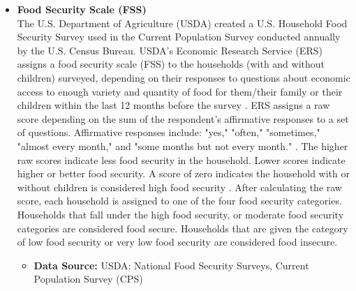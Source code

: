 \documentclass[12pt,letterpaper]{report}
\begin{document}
\begin{itemize}
\item\textbf{Food Security Scale (FSS)} 
\\The U.S. Department of Agriculture (USDA) created a U.S. Household Food Security Survey used in the Current Population Survey conducted annually by the U.S. Census Bureau. USDA's Economic Research Service (ERS) assigns a food security scale (FSS) to the households (with and without children) surveyed, depending on their responses to questions about economic access to enough variety and quantity of food for them/their family or their children within the last 12 months before the survey \cite{USDAERSFS}. ERS assigns a raw score depending on the sum of the respondent's affirmative responses to a set of questions. Affirmative responses include: "yes," "often," "sometimes," "almost every month," and "some months but not every month." \cite{USDAERSFS}.  The higher raw scores indicate less food security in the household. Lower scores indicate higher or better food security. A score of zero indicates the household with or without children is considered high food security \cite{USDAERSFS}. After calculating the raw score, each household is assigned to one of the four food security categories. Households that fall under the high food security, or moderate food security categories are considered food secure. Households that are given the category of low food security or very low food security are considered food insecure\cite{USDAERSFS}.

\begin{itemize}
\item \textbf{Data Source:} USDA: National Food Security Surveys, Current Population Survey (CPS)
\end{itemize}

\end{itemize}
\end{document}
